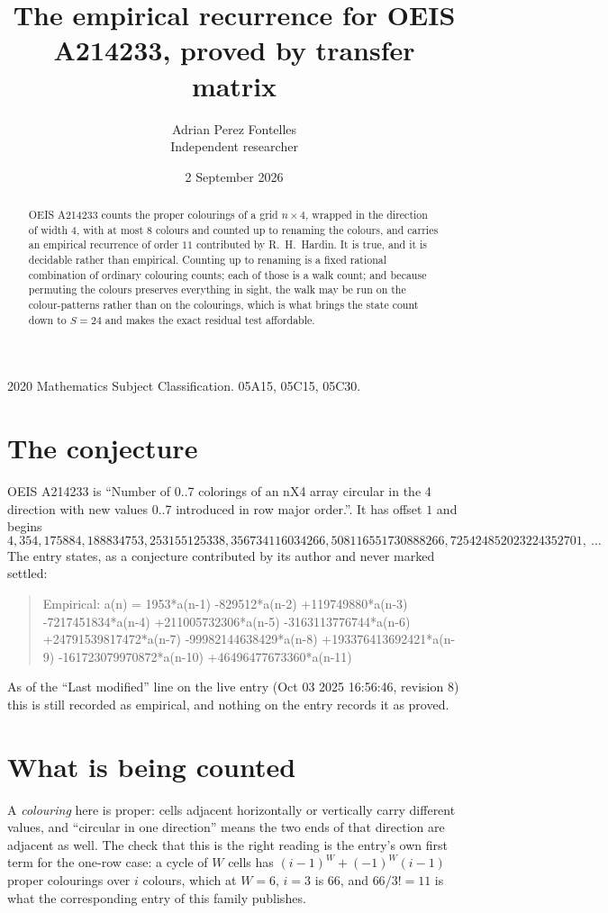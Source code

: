 \documentclass[11pt,a4paper]{article}
\title{The empirical recurrence for OEIS A214233, proved by transfer matrix}
\author{Adrian Perez Fontelles\\ \small Independent researcher}
\date{2 September 2026}
\theoremstyle{plain}
\theoremstyle{definition}
\begin{document}
\maketitle

\begin{abstract}
OEIS A214233 counts the proper colourings of a grid $n\times4$, wrapped in the direction of width $4$, with at most $8$ colours and
counted up to renaming the colours, and carries an empirical recurrence of order $11$
contributed by R.~H.~Hardin. It is true, and it is decidable rather than empirical. Counting
up to renaming is a fixed rational combination of ordinary colouring counts; each of those is
a walk count; and because permuting the colours preserves everything in sight, the walk may be
run on the colour-patterns rather than on the colourings, which is what brings the state count
down to $S=24$ and makes the exact residual test affordable.
\end{abstract}

\noindent\small 2020 Mathematics Subject Classification. 05A15, 05C15, 05C30.\normalsize

\section{The conjecture}

OEIS A214233 is ``Number of 0..7 colorings of an nX4 array circular in the 4 direction with new values 0..7 introduced in row major order.''. It has offset $1$ and begins
\[
4, 354, 175884, 188834753, 253155125338, 356734116034266, 508116551730888266, 725424852023224352701,\ \dots
\]
The entry states, as a conjecture contributed by its author and never marked settled:
\begin{quote}
Empirical: a(n) = 1953*a(n-1) -829512*a(n-2) +119749880*a(n-3) -7217451834*a(n-4) +211005732306*a(n-5) -3163113776744*a(n-6) +24791539817472*a(n-7) -99982144638429*a(n-8) +193376413692421*a(n-9) -161723079970872*a(n-10) +46496477673360*a(n-11)
\end{quote}
As of the ``Last modified'' line on the live entry (Oct 03 2025 16:56:46, revision 8) this is still
recorded as empirical, and nothing on the entry records it as proved.

\section{What is being counted}

A \emph{colouring} here is proper: cells adjacent horizontally or vertically carry different
values, and ``circular in one direction'' means the two ends of that direction are adjacent as
well. The check that this is the right reading is the entry's own first term for the
one-row case: a cycle of $W$ cells has $(i-1)^W+(-1)^W(i-1)$ proper colourings over $i$
colours, which at $W=6$, $i=3$ is $66$, and $66/3!=11$ is what the corresponding entry of this
family publishes.
\end{document}

